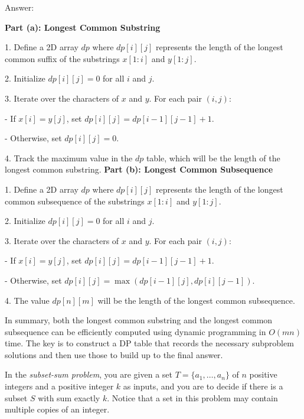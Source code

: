 \documentclass{oxmathproblems}
\begin{document}
\begin{questions}
Answer:

\textbf{Part (a): Longest Common Substring}

1. Define a 2D array \(dp\) where \(dp[i][j]\) represents the length of the longest common suffix of the substrings \(x[1:i]\) and \(y[1:j]\).

2. Initialize \(dp[i][j] = 0\) for all \(i\) and \(j\).

3. Iterate over the characters of \(x\) and \(y\). For each pair \((i, j)\):

   - If \(x[i] = y[j]\), set \(dp[i][j] = dp[i-1][j-1] + 1\).
   
   - Otherwise, set \(dp[i][j] = 0\).
   
4. Track the maximum value in the \(dp\) table, which will be the length of the longest common substring.
\newpage
\textbf{Part (b): Longest Common Subsequence}

1. Define a 2D array \(dp\) where \(dp[i][j]\) represents the length of the longest common subsequence of the substrings \(x[1:i]\) and \(y[1:j]\).

2. Initialize \(dp[i][j] = 0\) for all \(i\) and \(j\).

3. Iterate over the characters of \(x\) and \(y\). For each pair \((i, j)\):

   - If \(x[i] = y[j]\), set \(dp[i][j] = dp[i-1][j-1] + 1\).
   
   - Otherwise, set \(dp[i][j] = \max(dp[i-1][j], dp[i][j-1])\).
   
4. The value \(dp[n][m]\) will be the length of the longest common subsequence.


In summary, both the longest common substring and the longest common subsequence can be efficiently computed using dynamic programming in \(O(mn)\) time. The key is to construct a DP table that records the necessary subproblem solutions and then use those to build up to the final answer.

\miquestion[25]
In the \emph{subset-sum problem}, you are given a set $T=\{a_1,\ldots,a_n\}$ of $n$ positive integers and a positive integer $k$ as inputs, and you are to decide if there is a subset $S$ with sum exactly $k$. Notice that a set in this problem may contain multiple copies of an integer.
\end{questions}
\end{document}
